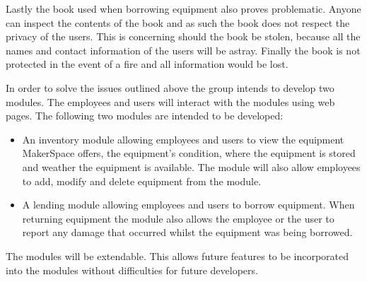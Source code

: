 Lastly the book used when borrowing equipment also proves problematic.
Anyone can inspect the contents of the book and as such the book does not respect the privacy of the users.
This is concerning should the book be stolen, because all the names and contact information of the users will be astray.
Finally the book is not protected in the event of a fire and all information would be lost.

In order to solve the issues outlined above the group intends to develop two modules.
The employees and users will interact with the modules using web pages.
The following two modules are intended to be developed:
\begin{itemize}
    \item An inventory module allowing employees and users to view the equipment MakerSpace offers, the equipment's condition, where the equipment is stored and weather the equipment is available.
    The module will also allow employees to add, modify and delete equipment from the module.
    \item A lending module allowing employees and users to borrow equipment.
    When returning equipment the module also allows the employee or the user to report any damage that occurred whilst the equipment was being borrowed.
\end{itemize}

The modules will be extendable.
This allows future features to be incorporated into the modules without difficulties for future developers.




